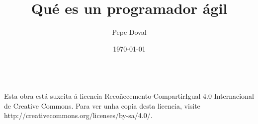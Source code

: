 \documentclass[12pt]{beamer}
\title{Qué es un programador ágil}
\author[Pepe Doval]{Pepe Doval}
\institute[SetPay | Agile Galicia]{SetPay | Agile Galicia}
\date{\today}
\begin{document}
\begin{frame}
  \titlepage
  \begin{tcolorbox}[]
    \centering
    {\small \bysa}\\
    {\tiny Esta obra está suxeita á licencia
      Recoñecemento-CompartirIgual 4.0 Internacional de Creative
      Commons. Para ver unha copia desta licencia, visite
      http://creativecommons.org/licenses/by-sa/4.0/.}
  \end{tcolorbox}
\end{frame}


\end{document}
